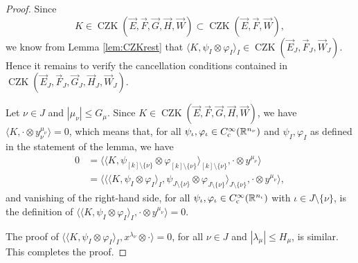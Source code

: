 \documentclass[11pt, reqno]{amsart}
\theoremstyle{definition}
\theoremstyle{remark}
\numberwithin{equation}{section}
\newcommand{\vE}{\vec E}
\newcommand{\vF}{\vec F}
\newcommand{\R}{\mathbb R}
\newcommand{\pair}[2]{\langle #1, #2 \rangle}
\newcommand{\Bpair}[2]{\Big\langle #1, #2 \Big\rangle}
\newcommand{\abs}[1]{|#1|}
\begin{document}
\begin{proof}
Since
$$K\in \operatorname{CZK}(\vE,\vF,\vec G,\vec H,\vec W)
\subset\operatorname{CZK}(\vE,\vF,\vec W),$$
we know from Lemma \ref{lem:CZKrest} that
$\pair{K}{\psi_I\otimes\varphi_I}_I\in \operatorname{CZK}(\vE_J,\vF_J,\vec W_J)$.
Hence it remains to verify the cancellation conditions contained in $\operatorname{CZK}(\vE_J,\vF_J,\vec G_J,\vec H_J,\vec W_J)$.

Let $\nu\in J$ and $\abs{\mu_\nu}\leq G_\mu$. Since
$K\in\operatorname{CZK}(\vE,\vF,\vec G,\vec H,\vec W)$, we have
$\pair{K}{\cdot\otimes y_\nu^{\mu_\nu}}=0$, which means that, for all $\psi_{\iota},\varphi_{\iota}\in C_{\rm c}^\infty(\R^{n_\nu})$ and $\psi_I,\varphi_I$ as defined in the statement of the lemma, we have
\begin{equation*}
\begin{split}
  0 &=\Bpair{ \pair{K}{\psi_{[k]\setminus\{\nu\}}\otimes\varphi_{[k]\setminus\{\nu\}}}_{[k]\setminus\{\nu\}} }{   \cdot \otimes y^{\mu_{\nu}}} \\
   &=\Bpair{ \Bpair{ \pair{K}{\psi_I\otimes\varphi_I}_I }{\psi_{J\setminus\{\nu\}}\otimes\varphi_{J\setminus\{\nu\}}}_{J\setminus\{\nu\}}
 }{   \cdot \otimes y^{\mu_{\nu}}},
\end{split}
\end{equation*}
and vanishing of the right-hand side, for all $\psi_\iota,\varphi_\iota\in C_{\rm c}^\infty(\R^{n_\iota})$ with $\iota\in J\setminus\{\nu\}$, is the definition of
$\pair{  \pair{K}{\psi_I\otimes\varphi_I}_I }{ \cdot \otimes y^{\mu_{\nu}} }=0$.

The proof of $\pair{  \pair{K}{\psi_I\otimes\varphi_I}_I }{ x^{\lambda_{\nu}} \otimes \cdot }=0$, for all $\nu\in J$ and $\abs{\lambda_\mu}\leq H_\mu$, is similar. This completes the proof.
\end{proof}
\end{document}
